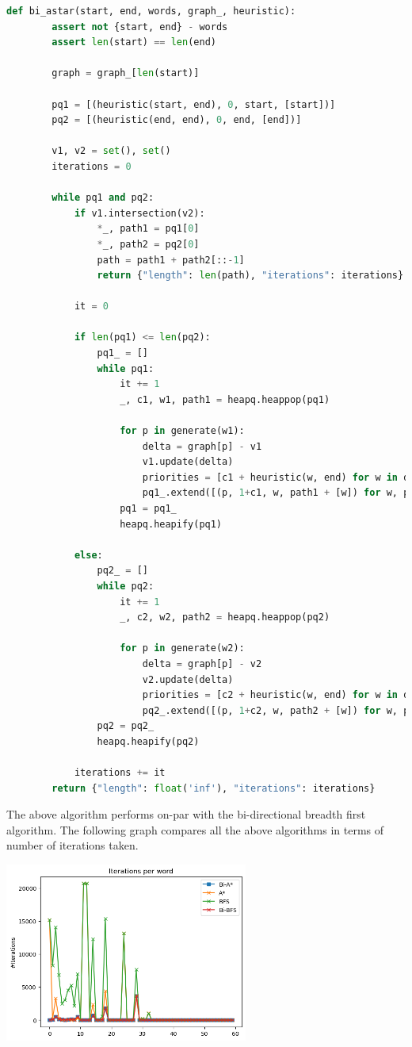 \documentclass[]{article}
\begin{document}
\begin{lstlisting}[language=Python]
	def bi_astar(start, end, words, graph_, heuristic):
		assert not {start, end} - words
		assert len(start) == len(end)
		
		graph = graph_[len(start)]
		
		pq1 = [(heuristic(start, end), 0, start, [start])]
		pq2 = [(heuristic(end, end), 0, end, [end])]
		
		v1, v2 = set(), set()
		iterations = 0
		
		while pq1 and pq2:
			if v1.intersection(v2):
				*_, path1 = pq1[0]
				*_, path2 = pq2[0]
				path = path1 + path2[::-1]
				return {"length": len(path), "iterations": iterations}
		
			it = 0
		
			if len(pq1) <= len(pq2):
				pq1_ = []
				while pq1:
					it += 1
					_, c1, w1, path1 = heapq.heappop(pq1)
					
					for p in generate(w1):  
						delta = graph[p] - v1
						v1.update(delta)
						priorities = [c1 + heuristic(w, end) for w in delta]
						pq1_.extend([(p, 1+c1, w, path1 + [w]) for w, p in zip(delta, priorities)])
					pq1 = pq1_
					heapq.heapify(pq1)
			
			else:
				pq2_ = []
				while pq2:
					it += 1
					_, c2, w2, path2 = heapq.heappop(pq2)
					
					for p in generate(w2):
						delta = graph[p] - v2
						v2.update(delta)
						priorities = [c2 + heuristic(w, end) for w in delta]
						pq2_.extend([(p, 1+c2, w, path2 + [w]) for w, p in zip(delta, priorities)])
				pq2 = pq2_
				heapq.heapify(pq2)
				
			iterations += it
		return {"length": float('inf'), "iterations": iterations}
\end{lstlisting}

The above algorithm performs on-par with the bi-directional breadth first algorithm. The following graph compares all the above algorithms in terms of number of iterations taken.

\begin{center}
	\includegraphics[width=0.6\textwidth]{images/iterations-index.png}
\end{center}
\end{document}
